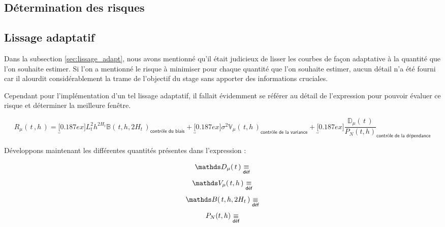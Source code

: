 	\subsection{Détermination des risques}


	\subsection{Lissage adaptatif}

	Dans la subsection \ref{sec:lissage_adapt}, nous avons mentionné qu'il était judicieux de lisser les courbes de façon adaptative à la quantité que l'on souhaite estimer. Si l'on a mentionné le risque à minimiser pour chaque quantité que l'on souhaite estimer, aucun détail n'a été fourni car il alourdit considérablement la trame de l'objectif du stage sans apporter des informations cruciales.

	\bigskip

	Cependant pour l'implémentation d'un tel lissage adaptatif, il fallait évidemment se référer au détail de l'expression pour pouvoir évaluer ce risque et déterminer la meilleure fenêtre.

	\bigskip

	\begin{equation*}
		R_\mu( \, t \, , h \, ) =
		\underbracket[0.187ex]{L_t^2 h ^{2H_t} \mathds B( \, t, h, 2H_t \,) }_{\textsf{contrôle du biais}}
		+ \underbracket[0.187ex]{\sigma^2 \mathds V_\mu( \, t, h \, ) }_{\textsf{contrôle de la variance}}
		+ \underbracket[0.187ex]{\frac{\mathds D_\mu( \, t \, )}{P_N(t, h)}}_{\textsf{contrôle de la dépendance}}
	\end{equation*}

	Développons maintenant les différentes quantités présentes dans l'expression :

	\begin{equation*}
		{\mathds D_\mu( \, t \, )} \isdef
	\end{equation*}
	\begin{equation*}
		\mathds V_\mu( \, t, h \, ) \isdef
	\end{equation*}
	\begin{equation*}
		\mathds B( \, t, h, 2H_t \,) \isdef
	\end{equation*}
	\begin{equation*}
		P_N(t, h) \isdef
	\end{equation*}
\fi
